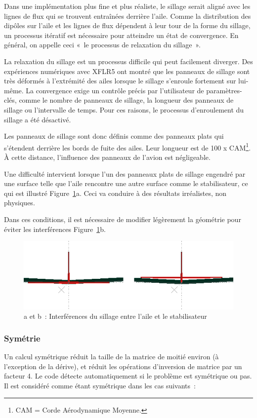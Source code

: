 \documentclass[a4paper,twoside,12pt,dvips]{article}
\begin{document}
Dans une implémentation plus fine et plus réaliste, le sillage serait aligné avec les lignes de flux qui se trouvent entraînées derrière l’aile. Comme la distribution des dipôles sur l’aile et les lignes de flux dépendent à leur tour de la forme du sillage, un processus itératif est nécessaire pour atteindre un état de convergence. En général, on appelle ceci «~le processus de relaxation du sillage~».

La relaxation du sillage est un processus difficile qui peut facilement diverger. Des expériences numériques avec XFLR5 ont montré que les panneaux de sillage sont très déformés à l’extrémité des ailes lorsque le sillage s’enroule fortement sur lui-même. La convergence exige un contrôle précis par l’utilisateur de paramètres-clés, comme le nombre de panneaux de sillage, la longueur des panneaux de sillage ou l’intervalle de temps. Pour ces raisons, le processus d’enroulement du sillage a été désactivé.

Les panneaux de sillage sont donc définis comme des panneaux plats qui s’étendent derrière les bords de fuite des ailes. Leur longueur est de 100 x CAM\footnote{CAM = Corde Aérodynamique Moyenne.}. À cette distance, l’influence des panneaux de l’avion est négligeable.

Une difficulté intervient lorsque l’un des panneaux plats de sillage engendré par une surface telle que l’aile rencontre une autre surface comme le stabilisateur, ce qui est illustré Figure~\ref{img:interférences_sillage}a. Ceci va conduire à des résultats irréalistes, non physiques. 

Dans ces conditions, il est nécessaire de modifier légèrement la géométrie pour éviter les interférences Figure~\ref{img:interférences_sillage}b.

\begin{figure}[htbp]
	\centering
	\includegraphics[width=0.8\linewidth]{img-14}
	\caption{a et b~: Interférences du sillage entre l’aile et le stabilisateur}
	\label{img:interférences_sillage}
\end{figure}

\subsubsection{Symétrie}
\label{symétrie}
Un calcul symétrique réduit la taille de la matrice de moitié environ (à 
l’exception de la dérive), et réduit les opérations d’inversion de matrice
par un facteur 4. Le code détecte automatiquement si le problème est
symétrique ou pas. Il est considéré comme étant symétrique dans les cas
suivants~:
\end{document}

